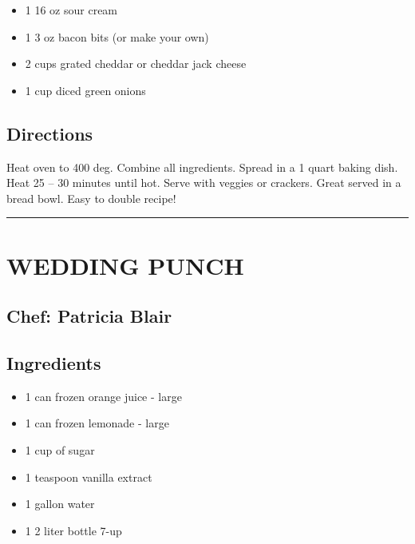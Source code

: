 \documentclass[
]{book}
\providecommand{\tightlist}{%
  \setlength{\itemsep}{0pt}\setlength{\parskip}{0pt}}
\begin{document}
\begin{itemize}
\tightlist
\item
  1 16 oz sour cream
\item
  1 3 oz bacon bits (or make your own)
\item
  2 cups grated cheddar or cheddar jack cheese
\item
  1 cup diced green onions
\end{itemize}

\hypertarget{directions-11}{%
\subsection*{Directions}\label{directions-11}}


Heat oven to 400 deg. Combine all ingredients.
Spread in a 1 quart baking dish. Heat 25 -- 30 minutes until hot.
Serve with veggies or crackers.
Great served in a bread bowl. Easy to double recipe!

\begin{center}\rule{0.5\linewidth}{0.5pt}\end{center}

\hypertarget{wedding-punch}{%
\section*{WEDDING PUNCH}\label{wedding-punch}}


\hypertarget{chef-patricia-blair-4}{%
\subsection*{Chef: Patricia Blair}\label{chef-patricia-blair-4}}


\hypertarget{ingredients-12}{%
\subsection*{Ingredients}\label{ingredients-12}}


\begin{itemize}
\tightlist
\item
  1 can frozen orange juice - large
\item
  1 can frozen lemonade - large
\item
  1 cup of sugar
\item
  1 teaspoon vanilla extract
\item
  1 gallon water
\item
  1 2 liter bottle 7-up
\end{itemize}
\end{document}
